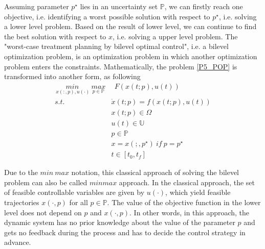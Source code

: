 \documentclass  [
  paper    = a4,
  BCOR     = 10mm,
  twoside,
  fontsize = 12pt,
  fleqn,
  toc      = bibnumbered,
  toc      = listofnumbered,
  numbers  = noendperiod,
  headings = normal,
  listof   = leveldown,
  version  = 3.03
]                                       {scrreprt}
\newcommand{\<}{\langle}
\renewcommand{\>}{\rangle}
\begin{document}
Assuming parameter $p^\star $ lies in an uncertainty set $ \mathbb{P}$, we can firstly reach one objective, i.e. identifying a worst possible solution with respect to $p^\star$, i.e. solving a lower level problem. Based on the result of lower level, we can continue to find the best solution with respect to $x$, i.e. solving a upper level problem. The "worst-case treatment planning by bilevel optimal control", i.e. a  bilevel optimization problem, is an optimization problem in which another optimization problem enters the constraints. Mathematically, the problem \ref{P5_POP} is transformed into another form,  as following
\begin{equation}
	\begin{aligned}
		\underset{\ x(:,p), u(\cdot)}{min} \   \underset{p  \in   \mathbb{P} }{max} & \ \ F(x(t;p), u(t)) \\ 
	s.t.\ \  &  \dot{x} (t;p) = f(x(t;p), u(t))\\ 
& x(t;p) \in \Omega \\
& u(t) \in \mathbb{U}  \\
& p  \in   \mathbb{P}  \\
& x = x(;,p^\star) \ if \ p = p^\star \\
& t \in [t_0, t_f]
	\end{aligned}
	\label{minmax}
\end{equation}

Due to the $min \ max$ notation, this classical approach of solving the bilevel problem can also be called $min max$ approach. In the classical approach, the set of feasible controllable variables are given by $u(\cdot)$, which yield feasible trajectories $x(\cdot, p)$ for all $p  \in   \mathbb{P}$. The value of the objective function in the lower level does not depend on $p$ and $x(\cdot, p)$. In other words, in this approach, the dynamic system has no prior knowledge about the value of the parameter $p$ and gets no feedback during the process and has to decide the control strategy in advance. 
\end{document}
